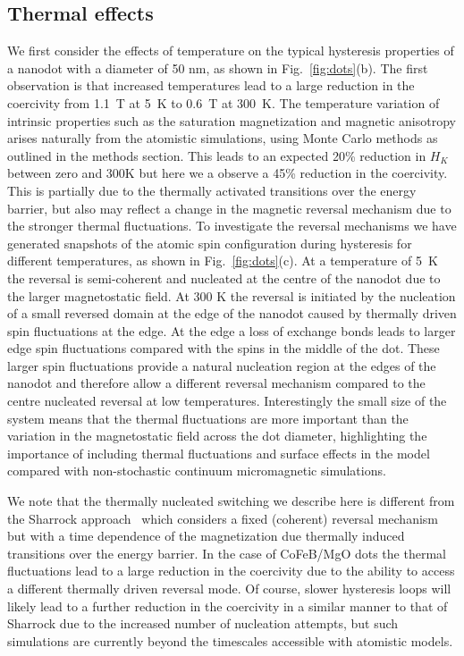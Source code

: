 \documentclass[aps,prb,signlecolumn,preprint,superscriptaddress,10]{revtex4-1}
\begin{document}
\subsection*{Thermal effects}
We first consider the effects of temperature on the typical hysteresis properties of a nanodot with a diameter of 50 nm, as shown in Fig.~\ref{fig:dots}(b). The first observation is that increased temperatures lead to a large reduction in the coercivity from 1.1~T at 5~K to 0.6~T at 300~K. The temperature variation of intrinsic properties such as the saturation magnetization and magnetic anisotropy arises naturally from the atomistic simulations, using Monte Carlo methods as outlined in the methods section. This leads to an expected 20\% reduction in $H_K$ between zero and 300K
but here we a observe a 45\% reduction in the coercivity. This is partially due to the thermally activated transitions over the energy barrier, but also may reflect  a change in the magnetic reversal mechanism due to the stronger thermal fluctuations. To investigate the reversal mechanisms we have generated snapshots of the atomic spin configuration during hysteresis for different temperatures, as shown in Fig.~\ref{fig:dots}(c). At a temperature of 5~K the reversal is semi-coherent and nucleated at the centre of the nanodot due to the larger magnetostatic field. At 300 K the reversal is initiated by the nucleation of a small reversed domain at the edge of the nanodot caused by thermally driven spin fluctuations at the edge. At the edge a loss of exchange bonds leads to larger edge spin fluctuations compared with the spins in the middle of the dot. These larger spin fluctuations provide a natural nucleation region at the edges of the nanodot and therefore allow a different reversal mechanism compared to the centre nucleated reversal at low temperatures.
Interestingly the small size of the system means that the thermal fluctuations are more important than the variation in the magnetostatic field across the dot diameter, highlighting the importance of including thermal fluctuations and surface effects in the model compared with non-stochastic continuum micromagnetic simulations.

We note that the thermally nucleated switching we describe here is different from the Sharrock approach~\cite{sharrock} which considers a fixed (coherent) reversal mechanism but with a time dependence of the magnetization due thermally  induced transitions over the energy barrier. In the case of CoFeB/MgO dots the thermal fluctuations lead to a large reduction in the coercivity due to the ability to access a different thermally driven reversal mode. Of course, slower hysteresis loops will likely lead to a further reduction in the coercivity in a similar manner to that of Sharrock due to the increased number of nucleation attempts, but such simulations are currently beyond the timescales accessible with atomistic models. 
\end{document}
